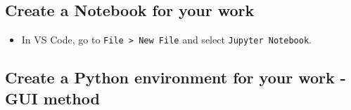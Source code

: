 \documentclass[
  letterpaper,
  DIV=11,
  numbers=noendperiod]{scrreprt}
\providecommand{\tightlist}{%
  \setlength{\itemsep}{0pt}\setlength{\parskip}{0pt}}\usepackage{longtable,booktabs,array}
\begin{document}
\hypertarget{create-a-notebook-for-your-work}{%
\subsection{Create a Notebook for your
work}\label{create-a-notebook-for-your-work}}

\begin{itemize}
\tightlist
\item
  In VS Code, go to \texttt{File\ \textgreater{}\ New\ File} and select
  \texttt{Jupyter\ Notebook}.
\end{itemize}

\hypertarget{create-a-python-environment-for-your-work---gui-method}{%
\subsection{Create a Python environment for your work - GUI
method}\label{create-a-python-environment-for-your-work---gui-method}}
\end{document}
